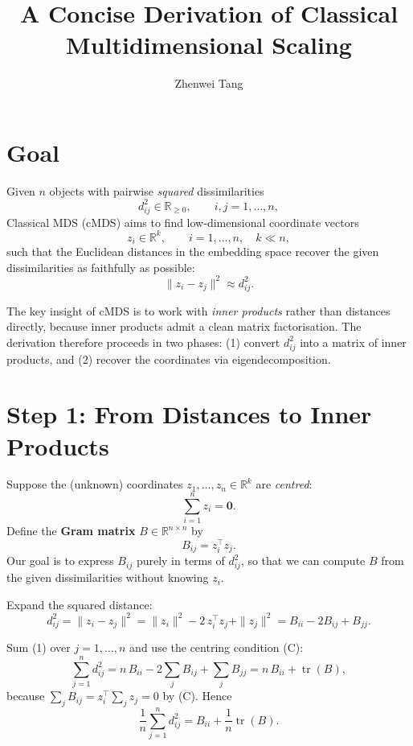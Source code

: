 \documentclass[11pt]{article}
\begin{document}
\title{A Concise Derivation of Classical Multidimensional Scaling}
\author{Zhenwei Tang}
\date{}
\maketitle

\section*{Goal}

Given $n$ objects with pairwise \emph{squared} dissimilarities
\[
  d_{ij}^{2} \in \mathbb{R}_{\ge 0}, \qquad i,j = 1,\dots,n,
\]
Classical MDS (cMDS) aims to find low-dimensional coordinate vectors
\[
  z_i \in \mathbb{R}^k, \qquad i = 1,\dots,n, \quad k \ll n,
\]
such that the Euclidean distances in the embedding space recover the
given dissimilarities as faithfully as possible:
\[
  \|z_i - z_j\|^2 \approx d_{ij}^{2}.
\]

The key insight of cMDS is to work with \emph{inner products} rather than
distances directly, because inner products admit a clean matrix
factorisation.  The derivation therefore proceeds in two phases:
(1) convert $d_{ij}^{2}$ into a matrix of inner products, and
(2) recover the coordinates via eigendecomposition.

\section*{Step 1: From Distances to Inner Products}

Suppose the (unknown) coordinates $z_1,\dots,z_n \in \mathbb{R}^k$ are
\emph{centred}:
\[
  \sum_{i=1}^{n} z_i = \mathbf{0}.          \tag{C}
\]
Define the \textbf{Gram matrix} $B \in \mathbb{R}^{n\times n}$ by
\[
  B_{ij} = z_i^{\top} z_j.
\]
Our goal is to express $B_{ij}$ purely in terms of $d_{ij}^{2}$, so that
we can compute $B$ from the given dissimilarities without knowing $z_i$.

Expand the squared distance:
\[
  d_{ij}^{2} = \|z_i - z_j\|^2
             = \|z_i\|^2 - 2\,z_i^{\top}z_j + \|z_j\|^2
             = B_{ii} - 2B_{ij} + B_{jj}.     \tag{1}
\]

Sum (1) over $j = 1,\dots,n$ and use the centring condition (C):
\[
  \sum_{j=1}^{n} d_{ij}^{2}
    = n\,B_{ii} - 2\sum_{j}B_{ij} + \sum_{j}B_{jj}
    = n\,B_{ii} + \operatorname{tr}(B),
\]
because $\sum_{j}B_{ij} = z_i^{\top}\!\sum_j z_j = 0$ by (C).  Hence
\[
  \frac{1}{n}\sum_{j=1}^{n} d_{ij}^{2}
    = B_{ii} + \frac{1}{n}\operatorname{tr}(B).  \tag{2}
\]
\end{document}
